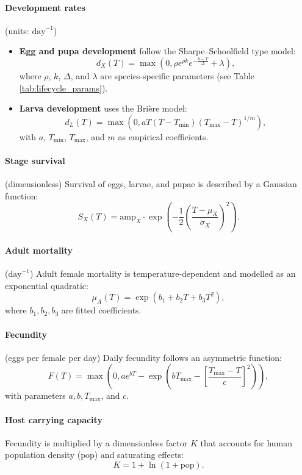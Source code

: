 \documentclass{article}
\begin{document}
\paragraph{Development rates} (units: $\mathrm{day}^{-1}$)
\begin{itemize}
  \item \textbf{Egg and pupa development} follow the Sharpe--Schoolfield type model:
  \[
  d_X(T) = \max \!\left(0, \rho e^{\rho k} e^{-\frac{k - T}{\Delta}} + \lambda \right),
  \]
  where $\rho$, $k$, $\Delta$, and $\lambda$ are species-specific parameters (see Table \ref{tab:lifecycle_params}).
  \item \textbf{Larva development} uses the Brière model:
  \[
  d_L(T) = \max \!\left(0, a T (T - T_{\min}) (T_{\max} - T)^{1/m} \right),
  \]
  with $a$, $T_{\min}$, $T_{\max}$, and $m$ as empirical coefficients.
\end{itemize}

\paragraph{Stage survival} (dimensionless)
Survival of eggs, larvae, and pupae is described by a Gaussian function:
\[
S_X(T) = \mathrm{amp}_X \cdot \exp \!\left( -\frac{1}{2} \left( \frac{T - \mu_X}{\sigma_X} \right)^2 \right).
\]

\paragraph{Adult mortality} ($\mathrm{day}^{-1}$)
Adult female mortality is temperature-dependent and modelled as an exponential quadratic:
\[
\mu_A(T) = \exp(b_1 + b_2 T + b_3 T^2),
\]
where $b_1, b_2, b_3$ are fitted coefficients.

\paragraph{Fecundity} (eggs per female per day)
Daily fecundity follows an asymmetric function:
\[
F(T) = \max \!\left(0, a e^{b T} - \exp \!\left( b T_{\max} - \left[ \frac{T_{\max} - T}{c} \right]^2 \right) \right),
\]
with parameters $a, b, T_{\max}$, and $c$.

\paragraph{Host carrying capacity}
Fecundity is multiplied by a dimensionless factor $K$ that accounts for human population density ($\mathrm{pop}$) and saturating effects:
\[
K = 1 + \ln(1 + \mathrm{pop}).
\]
\end{document}
